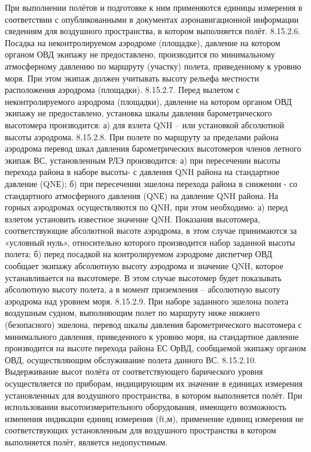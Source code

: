 При выполнении полётов и подготовке к ним применяются единицы измерения в соответствии с опубликованными в документах аэронавигационной информации сведениям для воздушного пространства, в котором выполняется полёт.
8.15.2.6. Посадка на неконтролируемом аэродроме (площадке), давление на котором органом ОВД экипажу не предоставлено, производится по минимальному атмосферному давлению по маршруту (участку) полета, приведенному к уровню моря. При этом экипаж должен учитывать высоту рельефа местности расположения аэродрома (площадки).
8.15.2.7. Перед вылетом с неконтролируемого аэродрома (площадки), давление на котором органом ОВД экипажу не предоставлено, установка шкалы давления барометрического высотомера производится:
а)	для взлета QNH – или установкой абсолютной высоты аэродрома.
8.15.2.8. При полете по маршруту за пределами района аэродрома перевод шкал давления барометрических высотомеров членов летного экипаж ВС, установленным РЛЭ производится:
а)	при пересечении высоты перехода района в наборе высоты- с давления QNH района на стандартное давление (QNЕ);
б)	при пересечении эшелона перехода района в снижении - со стандартного атмосферного давления (QNЕ) на давление QNH района. 
На горных аэродромах осуществляются по QNH, при этом необходимо:
а)	перед взлетом установить известное значение QNH. Показания высотомера, соответствующие абсолютной высоте аэродрома, в этом случае принимаются за «условный нуль», относительно которого производится набор заданной высоты полета;
б)	перед посадкой на контролируемом аэродроме диспетчер ОВД сообщает экипажу абсолютную высоту аэродрома и значение QNH, которое устанавливается на высотомере. В этом случае высотомер будет показывать абсолютную высоту полета, а в момент приземления – абсолютную высоту аэродрома над уровнем моря.
8.15.2.9. При наборе заданного эшелона полета воздушным судном, выполняющим полет по маршруту ниже нижнего (безопасного) эшелона, перевод шкалы давления барометрического высотомера с минимального давления, приведенного к уровню моря, на стандартное давление производится на высоте перехода района ЕС ОрВД, сообщаемой экипажу органом ОВД, осуществляющим обслуживание полета данного ВС. 
8.15.2.10. Выдерживание высот полёта от соответствующего барического уровня осуществляется по приборам, индицирующим их значение в единицах измерения установленных для воздушного пространства, в котором выполняется полёт. При использовании высотоизмерительного оборудования, имеющего возможность изменения индикации единиц измерения (ft,м), применение единиц измерения не соответствующих установленным для воздушного пространства в котором выполняется полёт, является недопустимым.
